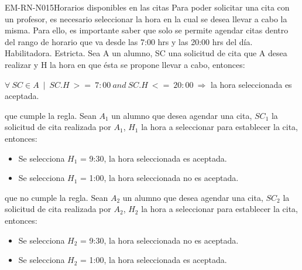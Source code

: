 \begin{BussinesRule}{EM-RN-N015}{Horarios disponibles en las citas}
	\BRitem[Descripción:] Para poder solicitar una cita con un profesor, es necesario seleccionar la hora en la cual se desea llevar a cabo la misma. Para ello, es importante saber que solo se permite agendar citas dentro del rango de horario que va desde las 7:00 hrs y las 20:00 hrs del día.  
	\BRitem[Tipo: ] Habilitadora.
	\BRitem[Nivel: ] Estricta.
	\BRitem[Sentenia: ] Sea A un alumno, SC una solicitud de cita que A desea realizar y H la hora en que ésta se propone llevar a cabo, entonces:
	\begin{center}
		$\forall \: SC \in A \: \mid \: SC.H \: >= \: 7:00 \: and \: SC.H \: <= \: 20:00 \: \Rightarrow$ la hora seleccionada es aceptada.
	\end{center}
	 que cumple la regla.
		Sean $A_{1}$ un alumno que desea agendar una cita, $SC_{1}$ la solicitud de cita realizada por $A_{1}$, $H_{1}$ la hora a seleccionar para establecer la cita, entonces:
		\begin{itemize}
			\item Se selecciona $H_{1}$ = 9:30, la hora seleccionada es aceptada.
			\item Se selecciona $H_{1}$ = 1:00, la hora seleccionada no es aceptada.
		\end{itemize}
	 que no cumple la regla.
		Sean $A_{2}$ un alumno que desea agendar una cita, $SC_{2}$ la solicitud de cita realizada por $A_{2}$, $H_{2}$ la hora a seleccionar para establecer la cita, entonces:
		\begin{itemize}
			\item Se selecciona $H_{2}$ = 9:30, la hora seleccionada no es aceptada.
			\item Se selecciona $H_{2}$ = 1:00, la hora seleccionada es aceptada.
		\end{itemize}

\end{BussinesRule}

